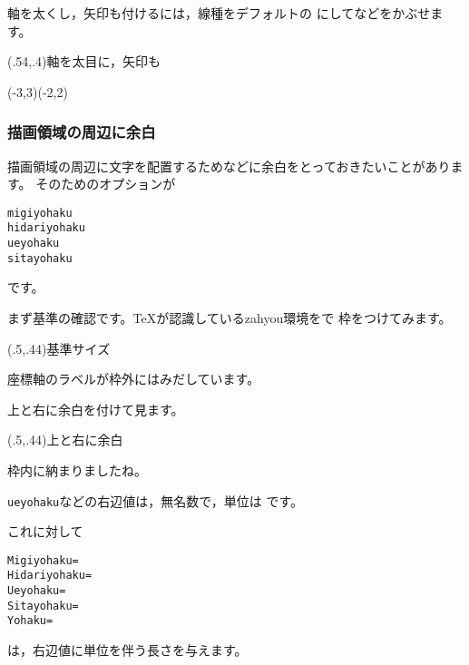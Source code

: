 軸を太くし，矢印も付けるには，線種をデフォルトの
にしてなどをかぶせます。

\begin{showEx}(.54,.4){軸を太目に，矢印も}
\begin{zahyou}[%
  ul=8mm,
  zikusensyu=\thicklines\arrowdrawline,
  arrowheadsize=2
  ]%
  (-3,3)(-2,2)%
\end{zahyou}%
\end{showEx}

\subsubsection{描画領域の周辺に余白}
描画領域の周辺に文字を配置するためなどに余白をとっておきたいことがあります。
そのためのオプションが
\begin{jquote}
\begin{verbatim}
migiyohaku
hidariyohaku
ueyohaku
sitayohaku
\end{verbatim}
\end{jquote}
です。

まず基準の確認です。\TeX が認識している\textsf{zahyou}環境をで
枠をつけてみます。

\begin{showEx}(.5,.44){基準サイズ}
\fboxsep=0pt%
\end{showEx}
座標軸のラベルが枠外にはみだしています。

上と右に余白を付けて見ます。

\begin{showEx}(.5,.44){上と右に余白}
\fboxsep=0pt%
\end{showEx}

枠内に納まりましたね。

\verb+ueyohaku+などの右辺値は，無名数で，単位は  です。

これに対して
\begin{jquote}
\begin{verbatim}
Migiyohaku=
Hidariyohaku=
Ueyohaku=
Sitayohaku=
Yohaku=
\end{verbatim}
\end{jquote}
は，右辺値に単位を伴う長さを与えます。

